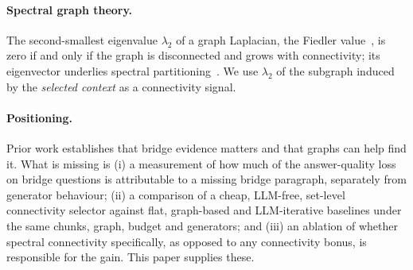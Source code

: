\paragraph{Spectral graph theory.}
The second-smallest eigenvalue $\lambda_2$ of a graph Laplacian, the Fiedler value~\cite{fiedler1973algebraic,chung1997spectral}, is zero if and only if the graph is disconnected and grows with connectivity; its eigenvector underlies spectral partitioning~\cite{shi2000normalized}. We use $\lambda_2$ of the subgraph induced by the \emph{selected context} as a connectivity signal.

\paragraph{Positioning.}
Prior work establishes that bridge evidence matters and that graphs can help find it. What is missing is (i) a measurement of how much of the answer-quality loss on bridge questions is attributable to a missing bridge paragraph, separately from generator behaviour; (ii) a comparison of a cheap, LLM-free, set-level connectivity selector against flat, graph-based and LLM-iterative baselines under the same chunks, graph, budget and generators; and (iii) an ablation of whether spectral connectivity specifically, as opposed to any connectivity bonus, is responsible for the gain. This paper supplies these.
